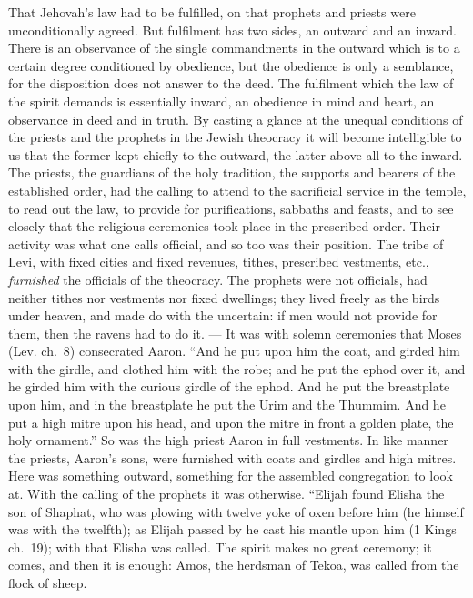\documentclass[12pt,a4paper,openany]{book}
\newcommand{\opage}[1]{\marginnote{\footnotesize\textit{[#1]}}}
\begin{document}
That Jehovah's law had to be fulfilled, on that prophets
and priests were unconditionally agreed. But fulfilment
has two sides, an outward and an inward. There is
an observance of the single commandments in the outward which
is to a certain degree conditioned by obedience, but the obedience
is only a semblance, for the disposition does not answer to
the deed. The fulfilment which the law of the spirit demands
is essentially inward, an obedience in mind and heart,
an observance in deed and in truth. By casting a
glance at the unequal conditions of the priests and the prophets in
the Jewish theocracy it will become intelligible to us that
the former kept chiefly to the outward, the latter above
all to the inward. The priests, the guardians of the holy tradition,
the supports and bearers of the established order,
had the calling to attend to the sacrificial service in the temple,
to read out the law, to provide for purifications, sabbaths and feasts,
and to see closely that the religious ceremonies took place
in the prescribed order. Their activity
was what one calls official, and so too was their
position. The tribe of Levi, with fixed cities and fixed revenues,
tithes, prescribed vestments, etc., \emph{furnished}
\setcounter{footnote}{0}%
\opage{50}the officials of the theocracy. The prophets were not
officials, had neither tithes nor vestments
nor fixed dwellings; they lived freely as the birds under
heaven, and made do with the uncertain: if men
would not provide for them, then the ravens had to do
it. --- It was with solemn ceremonies that Moses
(Lev. ch.~8) consecrated Aaron. ``And he put upon him the
coat, and girded him with the girdle, and
clothed him with the robe; and he put the ephod
over it, and he girded him with the curious girdle of the ephod.
And he put the breastplate upon him,
and in the breastplate he put the Urim and the Thummim. And
he put a high mitre upon his head, and upon the mitre
in front a golden plate, the holy ornament.'' So was
the high priest Aaron in full vestments. In like
manner the priests, Aaron's sons, were furnished with
coats and girdles and high mitres. Here was something
outward, something for the assembled congregation to look
at. With the calling of the prophets it was
otherwise. ``Elijah found Elisha the son of Shaphat, who was plowing
with twelve yoke of oxen before him (he himself was with the
twelfth); as Elijah passed by he cast his mantle
upon him (1 Kings ch.~19); with that Elisha was called.
The spirit makes no great ceremony; it comes, and
then it is enough: Amos, the herdsman of Tekoa, was called
from the flock of sheep.
\end{document}
